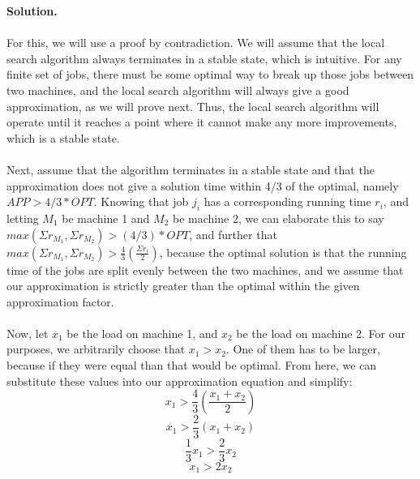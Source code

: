 \documentclass[11pt]{article}
\newcommand\solution{%
  \textbf{Solution.}\\%
}
\begin{document}
\begin{enumerate}
\solution \\
For this, we will use a proof by contradiction. We will assume that the local search algorithm always terminates in a stable state, which is intuitive. For any finite set of jobs, there must be some optimal way to break up those jobs between two machines, and the local search algorithm will always give a good approximation, as we will prove next. Thus, the local search algorithm will operate until it reaches a point where it cannot make any more improvements, which is a stable state. \\
\\
Next, assume that the algorithm terminates in a stable state and that the approximation does not give a solution time within 4/3 of the optimal, namely $APP > 4/3 * OPT$. Knowing that job $j_i$ has a corresponding running time $r_i$, and letting $M_1$ be machine 1 and $M_2$ be machine 2, we can elaborate this to say $max(\Sigma{r_{M_1}}, \Sigma{r_{M_2}}) > (4/3) * OPT$, and further that $max(\Sigma{r_{M_1}}, \Sigma{r_{M_2}}) > \frac{4}{3}(\frac{\Sigma{r_i}}{2})$, because the optimal solution is that the running time of the jobs are split evenly between the two machines, and we assume that our approximation is strictly greater than the optimal within the given approximation factor. \\
\\
Now, let $x_1$ be the load on machine 1, and $x_2$ be the load on machine 2. For our purposes, we arbitrarily choose that $x_1 > x_2$. One of them has to be larger, because if they were equal than that would be optimal. From here, we can substitute these values into our approximation equation and simplify:
\begin{equation*}
 x_1 > \frac{4}{3}(\frac{x_1 + x_2}{2})
\end{equation*}
\begin{equation*}
 x_1 > \frac{2}{3}(x_1 + x_2)
\end{equation*}
\begin{equation*}
 \frac{1}{3}x_1 > \frac{2}{3}x_2
\end{equation*}
\begin{equation*}
 x_1 > 2x_2
\end{equation*}


\end{enumerate}
\end{document}
